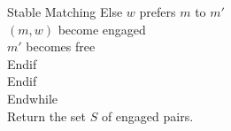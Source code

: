 \documentclass{beamer}
\begin{document}
\begin{frame}{Stable Matching}
{{                \hspace{2cm}Else $w$ prefers $m$ to $m'$\\
                \hspace{3cm}$(m, w)$ become engaged\\
                \hspace{3cm}$m'$ becomes free\\
                \hspace{2cm}Endif\\
                \hspace{1cm}Endif\\
                Endwhile\\
                Return the set $S$ of engaged pairs.
            }
        }
    \end{frame}    
\end{document}
